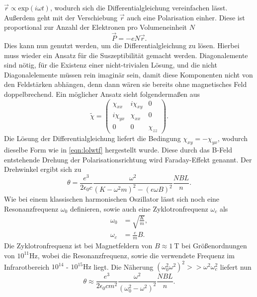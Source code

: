 $\vec{r} \propto \text{exp}(i\omega t)$, wodurch sich die Differentialgleichung vereinfachen lässt.
Außerdem geht mit der Verschiebung $\vec{r}$ auch eine Polarisation einher. Diese ist proportional zur Anzahl der Elektronen pro Volumeneinheit $N$
\begin{equation*}
\vec{P} = - e N\vec{r}.
\end{equation*}
Dies kann nun genutzt werden, um die Differentialgleichung zu lösen. Hierbei muss wieder ein Ansatz für die Suszeptibilität gemacht werden. Diagonalemente sind nötig, für die Existenz
einer nicht-trivialen Lösung, und die nicht Diagonalelemente müssen rein imaginär sein, damit diese Komponenten nicht von den Feldstärken abhängen, denn dann wären sie bereits ohne 
magnetisches Feld doppelbrechend.
Ein möglicher Ansatz sieht folgendermaßen aus 
\begin{equation*}
    \tilde{\chi} = \begin{pmatrix}
        \chi_{xx} & i\chi_{xy} & 0 \\
        i\chi_{yx} & \chi_{xx} & 0 \\
        0 & 0 & \chi_{zz}
        \end{pmatrix}.
\end{equation*}
Die Lösung der Differentialgleichung liefert die Bedingung $\chi_{xy} = -\chi_{yx}$, wodurch dieselbe Form wie in \eqref{eqn:lolwtf} hergestellt wurde.
Diese durch das B-Feld entstehende Drehung der Polarisationsrichtung wird Faraday-Effekt genannt.
Der Drehwinkel ergibt sich zu
\begin{equation}
\theta = \frac{e^3}{2 \epsilon_0 c} \frac{\omega^2}{(K - \omega^2 m)^2 - (e\omega B)^2} \frac{NBL}{n}.
\end{equation}
Wie bei einem klassischen harmonischen Oszillator lässt sich noch eine Resonanzfrequenz $\omega_0$ definieren, sowie auch eine Zyklotronfrequenz $\omega_c$ als
\begin{align*}
\omega_0 &= \sqrt{\frac{K}{m}}, \\
\omega_c &= \frac{e}{m}B.
\end{align*}
Die Zyklotronfrequenz ist bei Magnetfeldern von $B \approx \SI{1}{\tesla}$ bei Größenordnungen von $10^{11}\si{\hertz}$, wobei die Resonanzfrequenz, sowie die verwendete Frequenz im
Infrarotbereich $10^{14}$ - $10^{15}\si{\hertz}$ liegt. Die Näherung $(\omega^2_0 \omega^2)^2 >> \omega^2\omega^2_c$ liefert nun
\begin{equation*}
    \theta \approx \frac{e^3}{2 \epsilon_0 c m^2} \frac{\omega^2}{(\omega^2_0 -\omega^2)^2} \frac{NBL}{n}.
\end{equation*}
